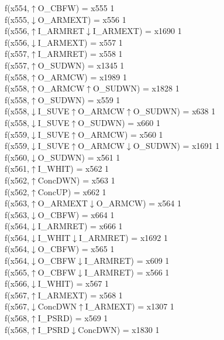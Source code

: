 f(x554,$\uparrow$O\_CBFW) = x555 {1} \\
f(x555,$\downarrow$O\_ARMEXT) = x556 {1} \\
f(x556,$\uparrow$I\_ARMRET$\downarrow$I\_ARMEXT) = x1690 {1} \\
f(x556,$\downarrow$I\_ARMEXT) = x557 {1} \\
f(x557,$\uparrow$I\_ARMRET) = x558 {1} \\
f(x557,$\uparrow$O\_SUDWN) = x1345 {1} \\
f(x558,$\uparrow$O\_ARMCW) = x1989 {1} \\
f(x558,$\uparrow$O\_ARMCW$\uparrow$O\_SUDWN) = x1828 {1} \\
f(x558,$\uparrow$O\_SUDWN) = x559 {1} \\
f(x558,$\downarrow$I\_SUVE$\uparrow$O\_ARMCW$\uparrow$O\_SUDWN) = x638 {1} \\
f(x558,$\downarrow$I\_SUVE$\uparrow$O\_SUDWN) = x660 {1} \\
f(x559,$\downarrow$I\_SUVE$\uparrow$O\_ARMCW) = x560 {1} \\
f(x559,$\downarrow$I\_SUVE$\uparrow$O\_ARMCW$\downarrow$O\_SUDWN) = x1691 {1} \\
f(x560,$\downarrow$O\_SUDWN) = x561 {1} \\
f(x561,$\uparrow$I\_WHIT) = x562 {1} \\
f(x562,$\uparrow$ConcDWN) = x563 {1} \\
f(x562,$\uparrow$ConcUP) = x662 {1} \\
f(x563,$\uparrow$O\_ARMEXT$\downarrow$O\_ARMCW) = x564 {1} \\
f(x563,$\downarrow$O\_CBFW) = x664 {1} \\
f(x564,$\downarrow$I\_ARMRET) = x666 {1} \\
f(x564,$\downarrow$I\_WHIT$\downarrow$I\_ARMRET) = x1692 {1} \\
f(x564,$\downarrow$O\_CBFW) = x565 {1} \\
f(x564,$\downarrow$O\_CBFW$\downarrow$I\_ARMRET) = x609 {1} \\
f(x565,$\uparrow$O\_CBFW$\downarrow$I\_ARMRET) = x566 {1} \\
f(x566,$\downarrow$I\_WHIT) = x567 {1} \\
f(x567,$\uparrow$I\_ARMEXT) = x568 {1} \\
f(x567,$\downarrow$ConcDWN$\uparrow$I\_ARMEXT) = x1307 {1} \\
f(x568,$\uparrow$I\_PSRD) = x569 {1} \\
f(x568,$\uparrow$I\_PSRD$\downarrow$ConcDWN) = x1830 {1} \\
